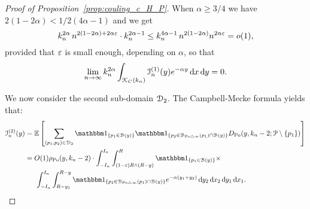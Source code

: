 \begin{proof}[Proof of Proposition~\ref{prop:couling_c_H_P}]
When $\alpha \ge 3/4$ we have $2(1-2\alpha) < 1/2(4\alpha - 1)$ and we get
\begin{equation*} 
k_n^{2\alpha} \, n^{2(1-2\alpha) + 2\alpha \varepsilon} \cdot k_n^{2\alpha -1}
\le  k_n^{4\alpha - 1} \, n^{2(1-2\alpha)} n^{2\alpha \varepsilon} = o(1),
\end{equation*}
provided that $\varepsilon$ is small enough, depending on $\alpha$, so that
\[
	\lim_{n \to \infty} k_n^{2\alpha} \int_{{\mathcal K}_{C}(k_n)} \mathcal{I}_n^{(1)}(y) e^{-\alpha y} \operatorname{\mathrm{d}\hspace{-2pt}} x \operatorname{\mathrm{d}\hspace{-2pt}} y = 0.
\]


We now consider the second sub-domain $\mathcal{D}_{2}$. The Campbell-Mecke formula yields that: 
\begin{align*}
	\mathcal{I}_n^{(2)}(y) 
	&= \Exp { \sum_{(p_1,p_2)  \in \dom{2}} \ind{p_1 \in \BallHyp{y}} \ind{p_2 \in \BallSym{p_1} \cap \BallHyp{y}}
		D_{\Po} (y,k_n-2;\Pcal \setminus \{ p_1\})} \\
	&= O(1) \rho_{\Po}(y,k_n-2) \cdot \int_{-I_n}^{I_n} \int_{(1-\eps) R \wedge (R-y)}^{R} 
		\ind{p_1 \in \BallHyp{y}} \times \\
	&\hspace{15pt} \int_{-I_n}^{I_n} \int_{R - y_1}^{R-y} \ind{p_2 \in \BallSym{p_1} \cap \BallHyp{y}}
		e^{-\alpha(y_1 + y_2)} \dd y_2 \dd x_2 \dd y_1 \dd x_1.
\end{align*}


\end{proof}
